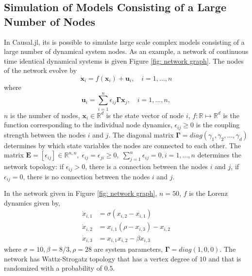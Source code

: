 \documentclass{juliacon}
\begin{document}
{\subsection{Simulation of Models Consisting of a Large Number of Nodes}
In Causal.jl, its is possible to simulate large scale complex models consisting of a large number of dynamical system nodes. As an example, a network of continuous time identical dynamical systems is given Figure \ref{fig: network graph}. The nodes of the network evolve by 
\begin{equation}
    \dot{\bm{x}}_i = f(\bm{x}_i) + \bm{u}_i, \quad i = 1, \ldots, n
    \label{eq: network equation}
\end{equation}
where 
\begin{equation}
    \bm{u}_i = \sum_{i = 1}^n \epsilon_{ij} \bm{\Gamma} \bm{x}_j, \quad i = 1, \ldots, n,
    \label{eq: network node inputs}
\end{equation}
$n$ is the number of nodes, $\bm{x}_i \in \mathbb{R}^d$ is the state vector of node $i$, $f: \mathbb{R} \mapsto \mathbb{R}^d$ is the function corresponding to the individual node dynamics, $\epsilon_{ij} \geq 0 $ is the coupling strength between the nodes $i$ and $j$. The diagonal matrix $\bm{\Gamma} = diag(\gamma_1, \gamma_2,  \ldots, \gamma_d)$ determines by which state variables the nodes are connected to each other. The matrix $\bm{E} = [\epsilon_{ij}] \in \mathbb{R}^{n, n}, \; \epsilon_{ij} = \epsilon_{ji} \geq 0, \; \sum_{j = 1}^n \epsilon_{ij} = 0, i = 1, \ldots, n$ determines the network topology: if $\epsilon_{ij} > 0$, there is a connection between the nodes $i$ and $j$, if $\epsilon_{ij} = 0$, there is no connection between the nodes $i$ and $j$.

In the network given in Figure \ref{fig: network graph}, $n=50$,  $f$ is the Lorenz dynamics given by,
\begin{equation}
    \begin{split}
        \dot{x}_{i,1} &= \sigma (x_{i, 2} - x_{i, 1}) \\
        \dot{x}_{i,2} &= x_{i, 1} (\rho -  x_{i, 3}) - x_{i, 2} \\
        \dot{x}_{i,3} &= x_{i, 1} x_{i, 2} - \beta x_{i, 3}
    \end{split}
\end{equation}
where $\sigma=10, \beta=8/3, \rho=28$ are system parameters, $\bm{\Gamma} = diag(1, 0, 0)$. The network has Wattz-Strogatz topology that has a vertex degree of $10$ and that is randomized with a probability of $0.5$\cite{watts1998collective}.

}
\end{document}
